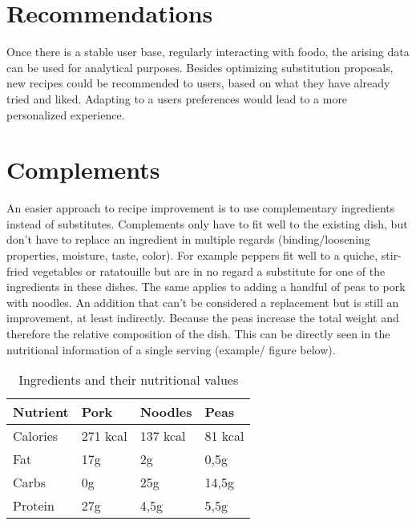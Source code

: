 \section*{Recommendations}
Once there is a stable user base, regularly interacting with foodo, the arising data can be used for analytical purposes. Besides optimizing substitution proposals, new recipes could be recommended to users, based on what they have already tried and liked. Adapting to a users preferences would lead to a more personalized experience.

\section*{Complements}
An easier approach to recipe improvement is to use complementary ingredients instead of substitutes. Complements only have to fit well to the existing dish, but don't have to replace an ingredient in multiple regards (binding/loosening properties, moisture, taste, color). 
For example peppers fit well to a quiche, stir-fried vegetables or ratatouille but are in no regard a substitute for one of the ingredients in these dishes. The same applies to adding a handful of peas to pork with noodles. An addition that can’t be considered a replacement but is still an improvement, at least indirectly. Because the peas increase the total weight and therefore the relative composition of the dish. This can be directly seen in the nutritional information of a single serving (example/ figure below). 

\begin{table}[H]
	\hspace{-5pt}
	\begin{scriptsize}
		\begin{tabularx}{\textwidth + 5pt}{| @{\hspace{3pt}} M | @{\hspace{3pt}} M | @{\hspace{3pt}} M | @{\hspace{3pt}} M |}
		\hline
		\textbf{Nutrient} & \textbf{Pork} & \textbf{Noodles} & \textbf{Peas}\\
		\hline
		Calories & 271 kcal & 137 kcal  & 81 kcal\\
		\hline
		Fat & 17g & 2g  & 0,5g\\
		\hline
		Carbs & 0g & 25g  & 14,5g\\
		\hline
		Protein & 27g & 4,5g  & 5,5g\\
		\hline
	\end{tabularx}
	\end{scriptsize}
	\caption{Ingredients and their nutritional values}
	\vspace{1em}
\end{table}

